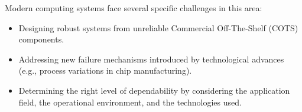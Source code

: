 Modern computing systems face several specific challenges in this area:
\begin{itemize}
    \item Designing robust systems from unreliable Commercial Off-The-Shelf (COTS) components.
    \item Addressing new failure mechanisms introduced by technological advances (e.g., process variations in chip manufacturing).
    \item Determining the right level of dependability by considering the application field, the operational environment, and the technologies used.
\end{itemize}